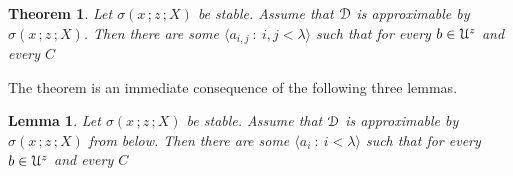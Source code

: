 \documentclass{amsproc}
\makeatletter
\newcommand{\mylabel}[1]{{#1}\hfill}
\renewenvironment{itemize}
  {\begin{list}{$\triangleright$}{%
  \setlength{\parskip}{0mm}
  \setlength{\topsep}{.1\baselineskip}
  \setlength{\rightmargin}{0mm}
  \setlength{\listparindent}{0mm}
  \setlength{\itemindent}{0mm}
  \setlength{\labelwidth}{3ex}
  \setlength{\itemsep}{.1\baselineskip}
  \setlength{\parsep}{.1\baselineskip}
  \setlength{\partopsep}{0mm}
  \setlength{\labelsep}{1ex}
  \setlength{\leftmargin}{\labelwidth+\labelsep}
  \let\makelabel\mylabel}}{%
\end{list}}
\newcounter{thm}
\theoremstyle{mio}
\newtheorem{theorem}[thm]{Theorem}\tcolorboxenvironment{theorem}{mythm}
\newtheorem{lemma}[thm]{Lemma}\tcolorboxenvironment{lemma}{mythm}
\newtheorem{fact}[thm]{Fact}\tcolorboxenvironment{fact}{mythm}
\providecommand{\proofNameStyle}{\bfseries}
\renewenvironment{proof}[1][\proofname]{\par
  \pushQED{\qed}%
  \normalfont%
  \trivlist
  \item[\hskip\labelsep
        \proofNameStyle
    #1\@addpunct{.}]\ignorespaces
}{%
  \popQED\endtrivlist\@endpefalse
}
\makeatother
\begin{document}



    




\begin{theorem}\label{thm_stability_definability}
  Let $\sigma(x\,;z\,;X)$ be stable.
  Assume that ${\EuScript D}$ is approximable by $\sigma(x\,;z\,;X)$.
  Then there are some $\langle a_{i,j}\ :\ i,j<\lambda\rangle$ such that for every $b\in{\EuScript U}^z$ and every $C$\medskip

  \medskip

\end{theorem}

\begin{proof}
  The theorem is an immediate consequence of the following three lemmas.
\end{proof}

\begin{lemma}\label{lem_1_inf}
  Let $\sigma(x\,;z\,;X)$ be stable.
  Assume that ${\EuScript D}$ is approximable by $\sigma(x\,;z\,;X)$ from below.
  Then there are some $\langle a_i\ :\ i<\lambda\rangle$ such that for every $b\in{\EuScript U}^z$ and every $C$\medskip

  \medskip 

\end{lemma}
\end{document}

